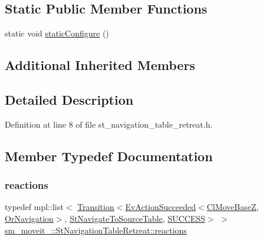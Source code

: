 \subsection*{Static Public Member Functions}
\begin{DoxyCompactItemize}
\item 
static void \hyperlink{structsm__moveit__4_1_1StNavigationTableRetreat_a499aca1e3a8cf140072466558bf99cf8}{static\+Configure} ()
\end{DoxyCompactItemize}
\subsection*{Additional Inherited Members}


\subsection{Detailed Description}


Definition at line 8 of file st\+\_\+navigation\+\_\+table\+\_\+retreat.\+h.



\subsection{Member Typedef Documentation}
\mbox{\label{structsm__moveit__4_1_1StNavigationTableRetreat_abc8d03746076d2cf10d7c9b8cd31537c}} 
\subsubsection{\texorpdfstring{reactions}{reactions}}
{\footnotesize\ttfamily typedef mpl\+::list$<$ \hyperlink{classsmacc_1_1Transition}{Transition}$<$\hyperlink{structsmacc_1_1default__events_1_1EvActionSucceeded}{Ev\+Action\+Succeeded}$<$\hyperlink{classcl__move__base__z_1_1ClMoveBaseZ}{Cl\+Move\+BaseZ}, \hyperlink{classsm__moveit__4_1_1OrNavigation}{Or\+Navigation}$>$, \hyperlink{structsm__moveit__4_1_1StNavigateToSourceTable}{St\+Navigate\+To\+Source\+Table}, \hyperlink{structsmacc_1_1default__transition__tags_1_1SUCCESS}{S\+U\+C\+C\+E\+SS}$>$ $>$ \hyperlink{structsm__moveit__4_1_1StNavigationTableRetreat_abc8d03746076d2cf10d7c9b8cd31537c}{sm\+\_\+moveit\+\_\+::\+St\+Navigation\+Table\+Retreat\+::reactions}}



